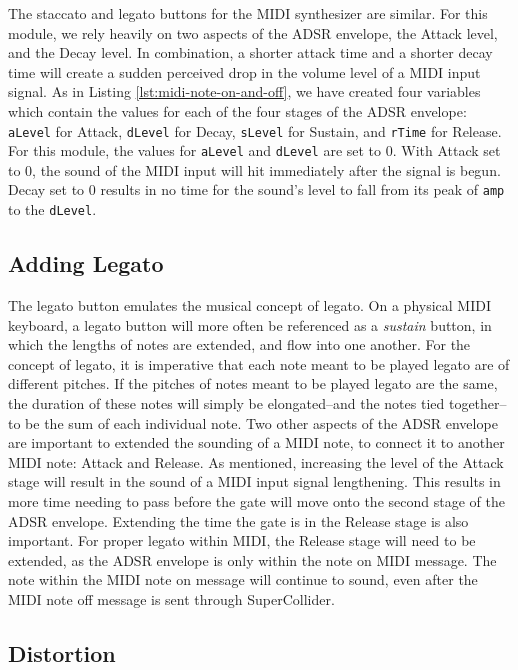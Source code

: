 The staccato and legato buttons for the MIDI synthesizer are similar. For this module, we rely heavily on two aspects of the ADSR envelope, the Attack level, and the Decay level. In combination, a shorter attack time and a shorter decay time will create a sudden perceived drop in the volume level of a MIDI input signal. As in Listing \ref{lst:midi-note-on-and-off}, we have created four variables which contain the values for each of the four stages of the ADSR envelope: \texttt{aLevel} for Attack, \texttt{dLevel} for Decay, \texttt{sLevel} for Sustain, and \texttt{rTime} for Release. For this module, the values for \texttt{aLevel} and \texttt{dLevel} are set to 0. With Attack set to 0, the sound of the MIDI input will hit immediately after the signal is begun. Decay set to 0 results in no time for the sound's level to fall from its peak of \texttt{amp} to the \texttt{dLevel}.

\subsection{Adding Legato}

The legato button emulates the musical concept of legato. On a physical MIDI keyboard, a legato button will more often be referenced as a \textit{sustain} button, in which the lengths of notes are extended, and flow into one another. For the concept of legato, it is imperative that each note meant to be played legato are of different pitches. If the pitches of notes meant to be played legato are the same, the duration of these notes will simply be elongated--and the notes tied together--to be the sum of each individual note. Two other aspects of the ADSR envelope are important to extended the sounding of a MIDI note, to connect it to another MIDI note: Attack and Release. As mentioned, increasing the level of the Attack stage will result in the sound of a MIDI input signal lengthening. This results in more time needing to pass before the gate will move onto the second stage of the ADSR envelope. Extending the time the gate is in the Release stage is also important. For proper legato within MIDI, the Release stage will need to be extended, as the ADSR envelope is only within the note on MIDI message. The note within the MIDI note on message will continue to sound, even after the MIDI note off message is sent through SuperCollider.


\subsection{Distortion}

